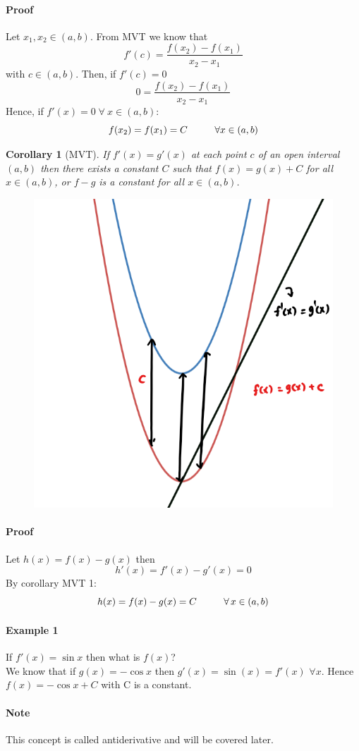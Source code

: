 \documentclass[12pt]{article}
\newcommand\tab[1][1cm]{\hspace*{#1}}
\newtheorem{corollary}{Corollary}
\begin{document}
\paragraph{Proof}
Let $x_1, x_2 \in (a,b)$. From MVT we know that 
\[
    f'(c) = \frac{f(x_2) - f(x_1)}{x_2 - x_1} 
\]
with $c \in (a,b)$. Then, if $f'(c) = 0$
\[
    0 = \frac{f(x_2) - f(x_1)}{x_2 - x_1} 
\]
Hence, if $f'(x) = 0 \; \forall \: x \in (a,b)$:
\[
    f(x_2) = f(x_1) = C \textrm{\tab} \forall x \in (a, b)
\]

\begin{corollary}[MVT] 
     If $f'(x) = g'(x)$ at each point $c$ of an open interval $(a,b)$ then there exists
     a constant $C$ such that $f(x) = g(x) + C$ for all $x \in (a,b) $, or $f - g$ is a constant 
     for all $x \in (a,b)$. 
\end{corollary}

\begin{figure}[h!]
     \centering
     \includegraphics[width = 0.35\linewidth]{Images/corollary 2.png}
\end{figure}
\paragraph{Proof}
Let $h(x) = f(x) - g(x)$ then
\[
    h'(x) = f'(x) - g'(x) = 0
\]
\noindent
By corollary MVT 1:
\[
    h(x) = f(x) - g(x) = C \textrm{\tab} \forall \, x \in (a,b)
\]

\paragraph{Example 1} If $f'(x) = \sin x$ then what is $f(x)$? \\

We know that if $g(x) = - \cos x$ then $g'(x) = \sin (x) = f'(x)$ $\forall x$.
Hence $f(x) = - \cos x + C$ with C is a constant. 

\paragraph{Note} This concept is called antiderivative and will be covered later.
\end{document}
